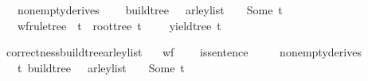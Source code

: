 \begin{isabellebody}
\ \ \ {\isachardoublequoteopen}nonempty{\isacharunderscore}{\kern0pt}derives\ {\isasymG}{\isachardoublequoteclose}\isanewline
\ \ \ {\isachardoublequoteopen}build{\isacharunderscore}{\kern0pt}tree\ {\isasymG}\ {\isasymomega}\ {\isacharparenleft}{\kern0pt}{\isasymE}arley{\isacharunderscore}{\kern0pt}list\ {\isasymG}\ {\isasymomega}{\isacharparenright}{\kern0pt}\ {\isacharequal}{\kern0pt}\ Some\ t{\isachardoublequoteclose}\isanewline
\ \ \ {\isachardoublequoteopen}wf{\isacharunderscore}{\kern0pt}rule{\isacharunderscore}{\kern0pt}tree\ {\isasymG}\ t\ {\isasymand}\ root{\isacharunderscore}{\kern0pt}tree\ t\ {\isacharequal}{\kern0pt}\ {\isasymSS}\ {\isasymG}\ {\isasymand}\ yield{\isacharunderscore}{\kern0pt}tree\ t\ {\isacharequal}{\kern0pt}\ {\isasymomega}{\isachardoublequoteclose}%
\isadelimproof
%
\endisadelimproof
%
\isatagproof
%
\endisatagproof
{\isafoldproof}%
%
\isadelimproof
%
\endisadelimproof
%
\begin{isamarkuptext}%
%
\end{isamarkuptext}\isamarkuptrue%
%
\isadelimdocument
%
\endisadelimdocument
%
\isatagdocument
%
\isamarkuptrue%
%
\endisatagdocument
{\isafolddocument}%
%
\isadelimdocument
%
\endisadelimdocument
{}\isamarkupfalse%
\ correctness{\isacharunderscore}{\kern0pt}build{\isacharunderscore}{\kern0pt}tree{\isacharunderscore}{\kern0pt}{\isasymE}arley{\isacharunderscore}{\kern0pt}list{\isacharcolon}{\kern0pt}\isanewline
\ \ \ {\isachardoublequoteopen}wf{\isacharunderscore}{\kern0pt}{\isasymG}\ {\isasymG}{\isachardoublequoteclose}\isanewline
\ \ \ {\isachardoublequoteopen}is{\isacharunderscore}{\kern0pt}sentence\ {\isasymG}\ {\isasymomega}{\isachardoublequoteclose}\isanewline
\ \ \ {\isachardoublequoteopen}nonempty{\isacharunderscore}{\kern0pt}derives\ {\isasymG}{\isachardoublequoteclose}\isanewline
\ \ \ {\isachardoublequoteopen}{\isacharparenleft}{\kern0pt}{\isasymexists}t{\isachardot}{\kern0pt}\ build{\isacharunderscore}{\kern0pt}tree\ {\isasymG}\ {\isasymomega}\ {\isacharparenleft}{\kern0pt}{\isasymE}arley{\isacharunderscore}{\kern0pt}list\ {\isasymG}\ {\isasymomega}{\isacharparenright}{\kern0pt}\ {\isacharequal}{\kern0pt}\ Some\ t{\isacharparenright}{\kern0pt}\ {\isasymlongleftrightarrow}\ {\isasymG}\ {\isasymturnstile}\ {\isacharbrackleft}{\kern0pt}{\isasymSS}\ {\isasymG}{\isacharbrackright}{\kern0pt}\ {\isasymRightarrow}\isactrlsup {\isacharasterisk}{\kern0pt}\ {\isasymomega}{\isachardoublequoteclose}%

\end{isabellebody}
